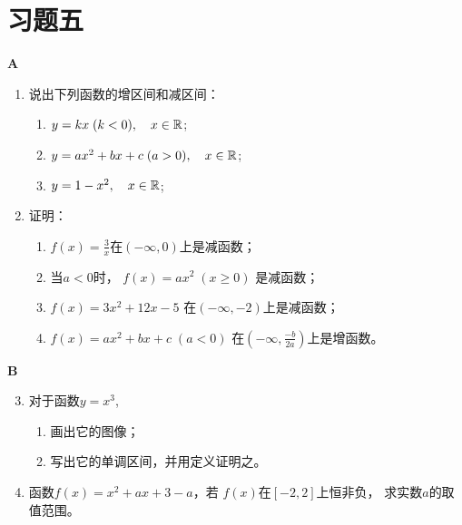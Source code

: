 \section*{习题五}
\begin{center}
\bfseries A
\end{center}

\begin{enumerate}
    \item 说出下列函数的增区间和减区间：
\begin{enumerate}[(1)]
    \item $y=kx\; (k<0),\quad x\in\mathbb{R}$;
    \item $y=ax^2+bx+c\; (a>0),\quad x\in\mathbb{R}$;
    \item $y=1-x^2,\quad x\in\mathbb{R}$;
\end{enumerate}
    \item 证明：
\begin{enumerate}[(1)]
    \item $f(x)=\frac{3}{x}$在$(-\infty,0)$上是减函数；
    \item 当$a<0$时， $f(x)=ax^2\; (x\ge 0)$
    是减函数；
 \item $f(x)=3x^2+12x-5$
    在$(-\infty,-2)$上是减函数；
 \item $f(x)=ax^2+bx+c\; (a<0)$   在$\left(-\infty,\frac{-b}{2a}\right)$上是增函数。
\end{enumerate}
\end{enumerate}


\begin{center}
\bfseries B
\end{center}

\begin{enumerate}\setcounter{enumi}{2}
    \item 对于函数$y=x^3$,
\begin{enumerate}[(1)]
\item 画出它的图像；
\item 写出它的单调区间，并用定义证明之。
\end{enumerate}

\item 函数$f(x)=x^2+ax+3-a$，若
$f(x)$在$[-2,2]$上恒非负，
求实数$a$的取值范围。
\end{enumerate}

